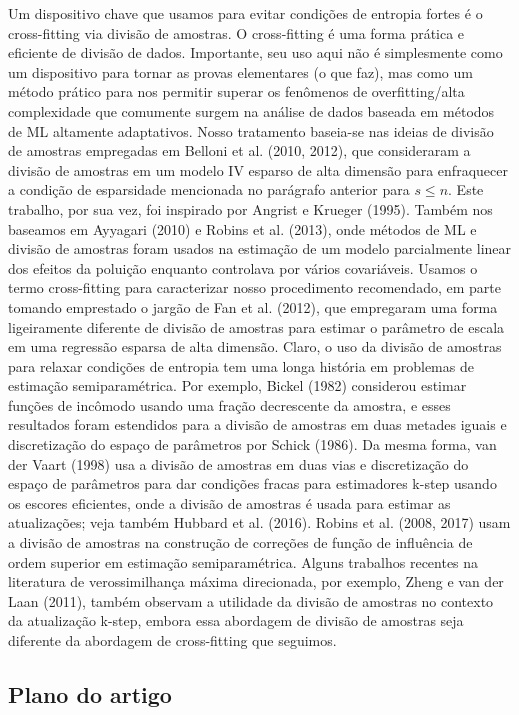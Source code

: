 \documentclass[a4paper,12pt]{article}[abntex2]
\begin{document}
Um dispositivo chave que usamos para evitar condições de entropia fortes é o cross-fitting via divisão de amostras. O cross-fitting é uma forma prática e eficiente de divisão de dados. Importante, seu uso aqui não é simplesmente como um dispositivo para tornar as provas elementares (o que faz), mas como um método prático para nos permitir superar os fenômenos de overfitting/alta complexidade que comumente surgem na análise de dados baseada em métodos de ML altamente adaptativos. Nosso tratamento baseia-se nas ideias de divisão de amostras empregadas em Belloni et al. (2010, 2012), que consideraram a divisão de amostras em um modelo IV esparso de alta dimensão para enfraquecer a condição de esparsidade mencionada no parágrafo anterior para $s \leq n$. Este trabalho, por sua vez, foi inspirado por Angrist e Krueger (1995). Também nos baseamos em Ayyagari (2010) e Robins et al. (2013), onde métodos de ML e divisão de amostras foram usados na estimação de um modelo parcialmente linear dos efeitos da poluição enquanto controlava por vários covariáveis. Usamos o termo cross-fitting para caracterizar nosso procedimento recomendado, em parte tomando emprestado o jargão de Fan et al. (2012), que empregaram uma forma ligeiramente diferente de divisão de amostras para estimar o parâmetro de escala em uma regressão esparsa de alta dimensão. Claro, o uso da divisão de amostras para relaxar condições de entropia tem uma longa história em problemas de estimação semiparamétrica. Por exemplo, Bickel (1982) considerou estimar funções de incômodo usando uma fração decrescente da amostra, e esses resultados foram estendidos para a divisão de amostras em duas metades iguais e discretização do espaço de parâmetros por Schick (1986). Da mesma forma, van der Vaart (1998) usa a divisão de amostras em duas vias e discretização do espaço de parâmetros para dar condições fracas para estimadores k-step usando os escores eficientes, onde a divisão de amostras é usada para estimar as atualizações; veja também Hubbard et al. (2016). Robins et al. (2008, 2017) usam a divisão de amostras na construção de correções de função de influência de ordem superior em estimação semiparamétrica. Alguns trabalhos recentes na literatura de verossimilhança máxima direcionada, por exemplo, Zheng e van der Laan (2011), também observam a utilidade da divisão de amostras no contexto da atualização k-step, embora essa abordagem de divisão de amostras seja diferente da abordagem de cross-fitting que seguimos.

\subsection*{Plano do artigo}
\end{document}
